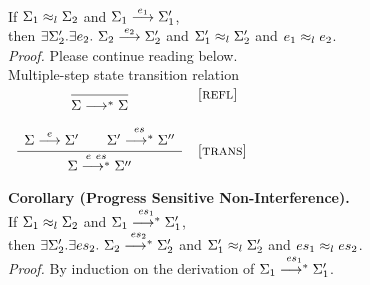 \\
If $\lequiv{l}{\Sigma_1}{\Sigma_2}$
and $\sstep{e_1}{\Sigma_1}{\Sigma_1'}$,
\\
then $\exists \Sigma_2'.\exists e_2.~\sstep{e_2}{\Sigma_2}{\Sigma_2'}$
and $\lequiv{l}{\Sigma_1'}{\Sigma_2'}$
and $\lequiv{l}{e_1}{e_2}$.
\\
\textit{Proof.}
Please continue reading below.
\\
 Multiple-step state transition relation
\\
$\startrules
  \mrule{refl}{
  }{
    \sstepstar{}{\Sigma}{\Sigma}
  }
  \mrule{trans}{
      \sstep{e}{\Sigma}{\Sigma'}
    \qquad
      \sstepstar{es}{\Sigma'}{\Sigma''}
  }{
    \sstepstar{e~es}{\Sigma}{\Sigma''}
  }
\finishrules$
\\
\textbf{Corollary (Progress Sensitive Non-Interference).}
\\
If $\lequiv{l}{\Sigma_1}{\Sigma_2}$
and $\sstepstar{es_1}{\Sigma_1}{\Sigma_1'}$,
\\
then $\exists \Sigma_2'.\exists es_2.~\sstepstar{es_2}{\Sigma_2}{\Sigma_2'}$
and $\lequiv{l}{\Sigma_1'}{\Sigma_2'}$
and $\lequiv{l}{es_1}{es_2}$.
\\
\textit{Proof.}
By induction on the derivation of $\sstepstar{es_1}{\Sigma_1}{\Sigma_1'}$.
